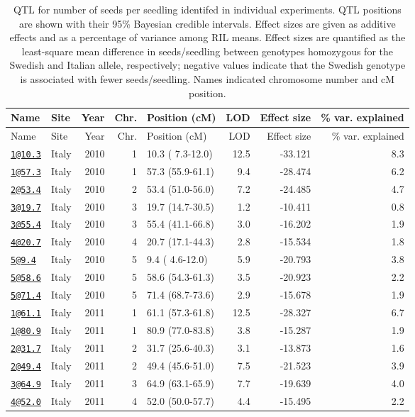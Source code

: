 \documentclass[
]{article}
\begin{document}
\begin{longtable}[]{@{}llrrlrrr@{}}
\caption{\label{tab:individual-tfit-qtl}QTL for number of seeds per seedling identifed in individual experiments. QTL positions are shown with their 95\% Bayesian credible intervals. Effect sizes are given as additive effects and as a percentage of variance among RIL means. Effect sizes are quantified as the least-square mean difference in seeds/seedling between genotypes homozygous for the Swedish and Italian allele, respectively; negative values indicate that the Swedish genotype is associated with fewer seeds/seedling. Names indicated chromosome number and cM position.}\tabularnewline
\toprule
Name & Site & Year & Chr. & Position (cM) & LOD & Effect size & \% var. explained\tabularnewline
\midrule
\endfirsthead
\toprule
Name & Site & Year & Chr. & Position (cM) & LOD & Effect size & \% var. explained\tabularnewline
\midrule
\endhead
\href{mailto:1@10.3}{\nolinkurl{1@10.3}} & Italy & 2010 & 1 & 10.3 ( 7.3-12.0) & 12.5 & -33.121 & 8.3\tabularnewline
\href{mailto:1@57.3}{\nolinkurl{1@57.3}} & Italy & 2010 & 1 & 57.3 (55.9-61.1) & 9.4 & -28.474 & 6.2\tabularnewline
\href{mailto:2@53.4}{\nolinkurl{2@53.4}} & Italy & 2010 & 2 & 53.4 (51.0-56.0) & 7.2 & -24.485 & 4.7\tabularnewline
\href{mailto:3@19.7}{\nolinkurl{3@19.7}} & Italy & 2010 & 3 & 19.7 (14.7-30.5) & 1.2 & -10.411 & 0.8\tabularnewline
\href{mailto:3@55.4}{\nolinkurl{3@55.4}} & Italy & 2010 & 3 & 55.4 (41.1-66.8) & 3.0 & -16.202 & 1.9\tabularnewline
\href{mailto:4@20.7}{\nolinkurl{4@20.7}} & Italy & 2010 & 4 & 20.7 (17.1-44.3) & 2.8 & -15.534 & 1.8\tabularnewline
\href{mailto:5@9.4}{\nolinkurl{5@9.4}} & Italy & 2010 & 5 & 9.4 ( 4.6-12.0) & 5.9 & -20.793 & 3.8\tabularnewline
\href{mailto:5@58.6}{\nolinkurl{5@58.6}} & Italy & 2010 & 5 & 58.6 (54.3-61.3) & 3.5 & -20.923 & 2.2\tabularnewline
\href{mailto:5@71.4}{\nolinkurl{5@71.4}} & Italy & 2010 & 5 & 71.4 (68.7-73.6) & 2.9 & -15.678 & 1.9\tabularnewline
\href{mailto:1@61.1}{\nolinkurl{1@61.1}} & Italy & 2011 & 1 & 61.1 (57.3-61.8) & 12.5 & -28.327 & 6.7\tabularnewline
\href{mailto:1@80.9}{\nolinkurl{1@80.9}} & Italy & 2011 & 1 & 80.9 (77.0-83.8) & 3.8 & -15.287 & 1.9\tabularnewline
\href{mailto:2@31.7}{\nolinkurl{2@31.7}} & Italy & 2011 & 2 & 31.7 (25.6-40.3) & 3.1 & -13.873 & 1.6\tabularnewline
\href{mailto:2@49.4}{\nolinkurl{2@49.4}} & Italy & 2011 & 2 & 49.4 (45.6-51.0) & 7.5 & -21.523 & 3.9\tabularnewline
\href{mailto:3@64.9}{\nolinkurl{3@64.9}} & Italy & 2011 & 3 & 64.9 (63.1-65.9) & 7.7 & -19.639 & 4.0\tabularnewline
\href{mailto:4@52.0}{\nolinkurl{4@52.0}} & Italy & 2011 & 4 & 52.0 (50.0-57.7) & 4.4 & -15.495 & 2.2\tabularnewline

\end{longtable}
\end{document}
